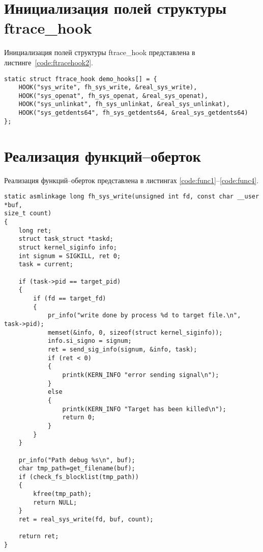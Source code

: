 \section{Инициализация полей структуры ftrace\_hook}

Инициализация полей структуры ftrace\_hook представлена в листинге~\ref{code:ftracehook2}.

\begin{lstlisting}[label=code:ftracehook2,caption=Инициализация полей структуры ftrace\_hook]
static struct ftrace_hook demo_hooks[] = {
	HOOK("sys_write", fh_sys_write, &real_sys_write),
	HOOK("sys_openat", fh_sys_openat, &real_sys_openat),
	HOOK("sys_unlinkat", fh_sys_unlinkat, &real_sys_unlinkat),
	HOOK("sys_getdents64", fh_sys_getdents64, &real_sys_getdents64)
};
\end{lstlisting}

\section{Реализация функций--оберток}

Реализация функций--оберток представлена в листингах \ref{code:func1}--\ref{code:func4}.

\begin{lstlisting}[label=code:func1,caption=Функция fh\_sys\_write]
static asmlinkage long fh_sys_write(unsigned int fd, const char __user *buf,
size_t count)
{
	long ret;
	struct task_struct *taskd;
	struct kernel_siginfo info;
	int signum = SIGKILL, ret 0;
	task = current;
	
	if (task->pid == target_pid)
	{
		if (fd == target_fd)
		{
			pr_info("write done by process %d to target file.\n", task->pid);
			memset(&info, 0, sizeof(struct kernel_siginfo));
			info.si_signo = signum;
			ret = send_sig_info(signum, &info, task);
			if (ret < 0)
			{
				printk(KERN_INFO "error sending signal\n");
			}
			else
			{
				printk(KERN_INFO "Target has been killed\n");
				return 0;
			}
		}
	}
	
	pr_info("Path debug %s\n", buf);
	char tmp_path=get_filename(buf);
	if (check_fs_blocklist(tmp_path))
	{
		kfree(tmp_path);
		return NULL;
	}
	ret = real_sys_write(fd, buf, count);

	return ret;
}
\end{lstlisting}

